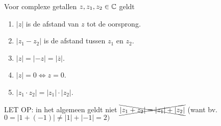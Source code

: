 \documentclass{ximera}
\begin{document}
\begin{proposition}\label{eig:complexe_modulus}
	Voor complexe getallen $z,z_1,z_2\in \mathbb{C}$ geldt
	\begin{enumerate}
		\item $|z|$ is de afstand van $z$ tot de oorsprong.
		\item $|z_1-z_2|$ is de afstand tussen $z_1$ en $z_2$.
		\item $|z|= |-z| = |\overline{z}|$.		
		\item $|z|=0 \iff  z=0 $.
		\item $|z_1\cdot z_2| = |z_1| \cdot |z_2|$.
		
		
	\end{enumerate}
	LET OP: in het algemeen geldt niet $\xcancel{|z_1+z_2| = |z_1|+|z_2|}$ (want bv. $0= |1+(-1)| \neq |1|+|-1| = 2)$
	
\end{proposition}
\end{document}
